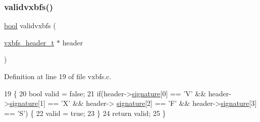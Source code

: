 \mbox{\label{a00197_a078a66e7d52fd4a6df768277b605199c_a078a66e7d52fd4a6df768277b605199c}} 
\subsubsection{\texorpdfstring{validvxbfs()}{validvxbfs()}}
{\footnotesize\ttfamily \hyperlink{a00134_af6a258d8f3ee5206d682d799316314b1_af6a258d8f3ee5206d682d799316314b1}{bool} validvxbfs (\begin{DoxyParamCaption}\item[{\hyperlink{a00200_ac5678b6d5dd5ed5ca86e5ccd4c30d39d_ac5678b6d5dd5ed5ca86e5ccd4c30d39d}{vxbfs\+\_\+header\+\_\+t} $\ast$}]{header }\end{DoxyParamCaption})}



Definition at line 19 of file vxbfs.\+c.


\begin{DoxyCode}
19                                         \{
20     \textcolor{keywordtype}{bool} valid = \textcolor{keyword}{false};
21     \textcolor{keywordflow}{if}(header->\hyperlink{a00334_a4c82fb69a08f04d22d832e030cc71577_a4c82fb69a08f04d22d832e030cc71577}{signature}[0] == \textcolor{charliteral}{'V'} && header->\hyperlink{a00334_a4c82fb69a08f04d22d832e030cc71577_a4c82fb69a08f04d22d832e030cc71577}{signature}[1] == \textcolor{charliteral}{'X'} && header->
      \hyperlink{a00334_a4c82fb69a08f04d22d832e030cc71577_a4c82fb69a08f04d22d832e030cc71577}{signature}[2] == \textcolor{charliteral}{'F'} && header->\hyperlink{a00334_a4c82fb69a08f04d22d832e030cc71577_a4c82fb69a08f04d22d832e030cc71577}{signature}[3] == \textcolor{charliteral}{'S'}) \{
22         valid = \textcolor{keyword}{true};
23     \}
24     \textcolor{keywordflow}{return} valid;
25 \}
\end{DoxyCode}

